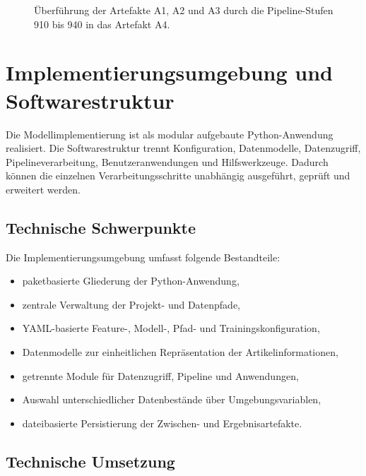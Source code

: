 \begin{figure}[H]
{} 
    \caption{ Überführung der Artefakte A1, A2 und A3 durch die Pipeline-Stufen 910 bis 940 in das Artefakt A4. } \label{fig:artefaktueberfuehrung_implementierung} 
\end{figure}

\section{Implementierungsumgebung und Softwarestruktur} 
\label{sec:implementierungsumgebung_und_softwarestruktur} 

Die Modellimplementierung ist als modular aufgebaute Python-Anwendung realisiert. Die Softwarestruktur trennt Konfiguration, Datenmodelle, Datenzugriff, Pipelineverarbeitung, Benutzeranwendungen und Hilfswerkzeuge. 
Dadurch können die einzelnen Verarbeitungsschritte unabhängig ausgeführt, geprüft und erweitert werden. 

\subsection{Technische Schwerpunkte} 
\label{subsec:technische_schwerpunkte_softwarestruktur} 

Die Implementierungsumgebung umfasst folgende Bestandteile: 
\begin{itemize} 
    \item paketbasierte Gliederung der Python-Anwendung, 
    \item zentrale Verwaltung der Projekt- und Datenpfade, 
    \item YAML-basierte Feature-, Modell-, Pfad- und Trainingskonfiguration, 
    \item Datenmodelle zur einheitlichen Repräsentation der Artikelinformationen, 
    \item getrennte Module für Datenzugriff, Pipeline und Anwendungen, 
    \item Auswahl unterschiedlicher Datenbestände über Umgebungsvariablen, 
    \item dateibasierte Persistierung der Zwischen- und Ergebnisartefakte. 
\end{itemize} 

\subsection{Technische Umsetzung} 
\label{subsec:technische_umsetzung_softwarestruktur} 

